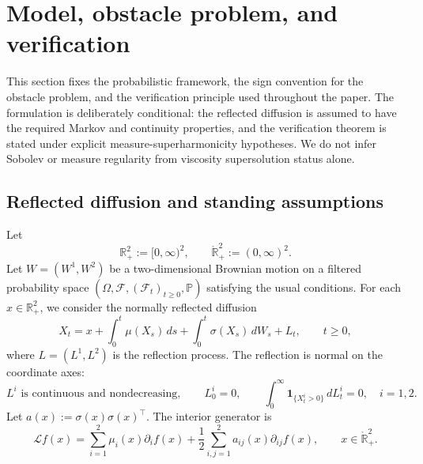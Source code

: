 \documentclass[pdflatex,sn-mathphys-num]{sn-jnl}
\theoremstyle{plain}
\theoremstyle{definition}
\newcommand{\R}{\mathbb{R}}
\newcommand{\interior}[1]{\mathring{#1}}
\begin{document}
\section{Model, obstacle problem, and verification}
\label{sec:model-verification}
This section fixes the probabilistic framework, the sign convention for the
obstacle problem, and the verification principle used throughout the paper.
The formulation is deliberately conditional: the reflected diffusion is
assumed to have the required Markov and continuity properties, and the
verification theorem is stated under explicit measure-superharmonicity
hypotheses. We do not infer Sobolev or measure regularity from viscosity
supersolution status alone.

\subsection{Reflected diffusion and standing assumptions}
\label{sec:reflected-diffusion-standing}
Let
\[
   \R^2_+:=[0,\infty)^2,
   \qquad
   \interior{\R}^2_+:=(0,\infty)^2.
\]
Let $W=(W^1,W^2)$ be a two-dimensional Brownian motion on a filtered
probability space
$(\Omega,\mathcal F,(\mathcal F_t)_{t\ge0},\mathbb P)$
satisfying the usual conditions. For each $x\in\R^2_+$, we consider the
normally reflected diffusion
\begin{equation}
\label{eq:reflected-sde}
   X_t
   =
   x
   +\int_0^t\mu(X_s)\,ds
   +\int_0^t\sigma(X_s)\,dW_s
   +L_t,
   \qquad t\ge0,
\end{equation}
where $L=(L^1,L^2)$ is the reflection process. The reflection is normal on the
coordinate axes:
\begin{equation}
\label{eq:normal-reflection}
   L^i \text{ is continuous and nondecreasing},\qquad
   L^i_0=0,\qquad
   \int_0^\infty \mathbf 1_{\{X_t^i>0\}}\,dL_t^i=0,
   \quad i=1,2.
\end{equation}
Let $a(x):=\sigma(x)\sigma(x)^\top$. The interior generator is
\[
   \mathcal L f(x)
   =
   \sum_{i=1}^2\mu_i(x)\partial_i f(x)
   +
   \frac12\sum_{i,j=1}^2a_{ij}(x)\partial_{ij}f(x),
   \qquad x\in\interior{\R}^2_+.
\]
\end{document}
